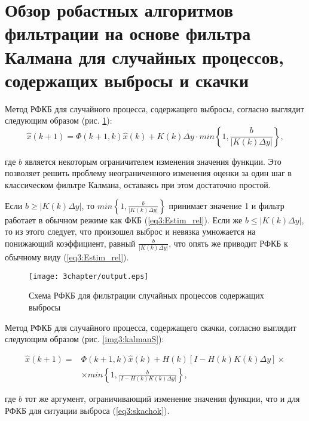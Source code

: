 \section{Обзор робастных алгоритмов фильтрации на основе фильтра Калмана для случайных процессов, содержащих выбросы и скачки} \label{sect3_grfk}

Метод РФКБ для случайного процесса, содержащего выбросы, согласно \cite{RobustFilter} выглядит следующим образом (рис. \ref{img3:kalmanV}):
\begin{equation}\label{eq3:skachok}
\hat{x}(k+1)=\Phi(k+1,k)\hat{x}(k)+K(k)\Delta y\cdot min\left\{1,\frac{b}{|K(k)\Delta y|}\right\},
\end{equation}

\noindent где $b$ является некоторым ограничителем изменения значения функции. 
Это позволяет решить проблему неограниченного изменения оценки за один шаг в классическом фильтре Калмана, оставаясь при этом достаточно простой.

Если $b\geq |K(k) \Delta y |$, то $min\left\{1,\frac{b}{|K(k)\Delta y|}\right\}$ принимает значение 1 и фильтр работает в обычном режиме как ФКБ (\ref{eq3:Estim_rel}). Если же $b\leq |K(k) \Delta y |$, то из этого следует, что произошел выброс и невязка умножается на понижающий коэффициент, равный $\frac{b}{|K(k)\Delta y|}$, что опять же приводит РФКБ к обычному виду (\ref{eq3:Estim_rel}).

\begin{figure} [h]
  \center
\texttt{[image: 3chapter/output.eps]}
  \caption{Схема РФКБ для фильтрации случайных процессов содержащих выбросы}
  \label{img3:kalmanV}
\end{figure}

Метод РФКБ для случайного процесса, содержащего скачки, согласно \cite{RobustFilter} выглядит следующим образом (рис. \ref{img3:kalmanS}):

\begin{equation}\label{eq3:vibros}
\begin{split}
\hat{x}(k+1)=&\Phi(k+1,k)\hat{x}(k)+H(k)[I-H(k)K(k)\Delta y]\times \\
&\times min\left\{1,\frac{b}{|I-H(k)K(k)\Delta y|}\right\},
\end{split}
\end{equation}

\noindent где $b$ тот же аргумент, ограничивающий изменение значения функции, что и для РФКБ для ситуации выброса (\ref{eq3:skachok}).



